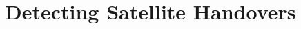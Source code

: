 \documentclass[IN,11pt,twoside,openright,idp,english]{tumthesis}
\begin{document}

\section{Detecting Satellite Handovers}


\end{document}
